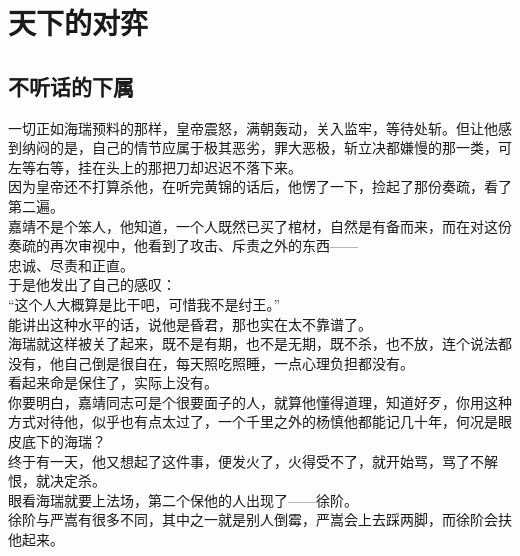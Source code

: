 \section{天下的对弈}
\ifnum{}
	\begin{multicols}{\theparacolNo}
\fi
\subsection{不听话的下属}
一切正如海瑞预料的那样，皇帝震怒，满朝轰动，关入监牢，等待处斩。但让他感到纳闷的是，自己的情节应属于极其恶劣，罪大恶极，斩立决都嫌慢的那一类，可左等右等，挂在头上的那把刀却迟迟不落下来。\\

因为皇帝还不打算杀他，在听完黄锦的话后，他愣了一下，捡起了那份奏疏，看了第二遍。\\

嘉靖不是个笨人，他知道，一个人既然已买了棺材，自然是有备而来，而在对这份奏疏的再次审视中，他看到了攻击、斥责之外的东西——\\

忠诚、尽责和正直。\\

于是他发出了自己的感叹：\\

“这个人大概算是比干吧，可惜我不是纣王。”\\

能讲出这种水平的话，说他是昏君，那也实在太不靠谱了。\\

海瑞就这样被关了起来，既不是有期，也不是无期，既不杀，也不放，连个说法都没有，他自己倒是很自在，每天照吃照睡，一点心理负担都没有。\\

看起来命是保住了，实际上没有。\\

你要明白，嘉靖同志可是个很要面子的人，就算他懂得道理，知道好歹，你用这种方式对待他，似乎也有点太过了，一个千里之外的杨慎他都能记几十年，何况是眼皮底下的海瑞？\\

终于有一天，他又想起了这件事，便发火了，火得受不了，就开始骂，骂了不解恨，就决定杀。\\

眼看海瑞就要上法场，第二个保他的人出现了——徐阶。\\

徐阶与严嵩有很多不同，其中之一就是别人倒霉，严嵩会上去踩两脚，而徐阶会扶他起来。\\


\end{multicols}
